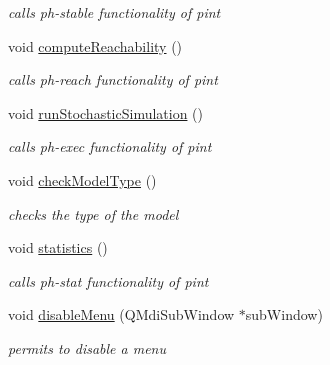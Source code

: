 \begin{DoxyCompactItemize}
\begin{DoxyCompactList}\small\item\em calls ph-\/stable functionality of pint \end{DoxyCompactList}\item 
\hypertarget{class_main_window_a0c7fe8e75bbc5113df5e514214908ab3}{void \hyperlink{class_main_window_a0c7fe8e75bbc5113df5e514214908ab3}{compute\-Reachability} ()}\label{class_main_window_a0c7fe8e75bbc5113df5e514214908ab3}

\begin{DoxyCompactList}\small\item\em calls ph-\/reach functionality of pint \end{DoxyCompactList}\item 
\hypertarget{class_main_window_ab8eeb1e902f4591fc2f35237a1faef01}{void \hyperlink{class_main_window_ab8eeb1e902f4591fc2f35237a1faef01}{run\-Stochastic\-Simulation} ()}\label{class_main_window_ab8eeb1e902f4591fc2f35237a1faef01}

\begin{DoxyCompactList}\small\item\em calls ph-\/exec functionality of pint \end{DoxyCompactList}\item 
\hypertarget{class_main_window_ace4bc6f63b25822514dd2250bbb4760f}{void \hyperlink{class_main_window_ace4bc6f63b25822514dd2250bbb4760f}{check\-Model\-Type} ()}\label{class_main_window_ace4bc6f63b25822514dd2250bbb4760f}

\begin{DoxyCompactList}\small\item\em checks the type of the model \end{DoxyCompactList}\item 
\hypertarget{class_main_window_a3eee76227ea883705553abe5e1f2a2be}{void \hyperlink{class_main_window_a3eee76227ea883705553abe5e1f2a2be}{statistics} ()}\label{class_main_window_a3eee76227ea883705553abe5e1f2a2be}

\begin{DoxyCompactList}\small\item\em calls ph-\/stat functionality of pint \end{DoxyCompactList}\item 
void \hyperlink{class_main_window_a5f56ea1ee38eb16074e654b8bd52d072}{disable\-Menu} (\-Q\-Mdi\-Sub\-Window $\ast$sub\-Window)
\begin{DoxyCompactList}\small\item\em permits to disable a menu \end{DoxyCompactList}\end{DoxyCompactItemize}
